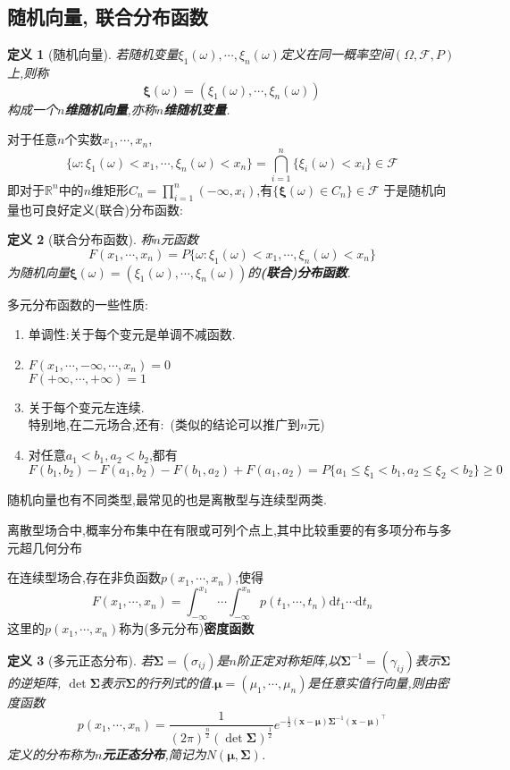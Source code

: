 \documentclass[12pt,a4paper]{article}
\newtheorem{definition}{定义}[subsection] %
\begin{document}
\subsection{随机向量, 联合分布函数}
\begin{definition}[随机向量]
    若随机变量$\xi_1(\omega),\cdots,\xi_n(\omega)$定义在同一概率空间$(\varOmega,\mathscr{F},P)$上,则称
    \[\bm{\xi}(\omega) = ( \xi_1(\omega), \cdots, \xi_n(\omega) )\]
    构成一个\textbf{$n$维随机向量},亦称\textbf{$n$维随机变量}.
\end{definition}
对于任意$n$个实数$x_1,\cdots,x_n$,\[\{ \omega: \xi_1(\omega)<x_1,\cdots,\xi_n(\omega)<x_n \} = \bigcap_{i=1}^{n}\{\xi_i(\omega)<x_i\} \in \mathscr{F}\]
即对于$\mathbb{R}^n$中的$n$维矩形$C_n=\prod_{i=1}^n(-\infty,x_i)$,有$\{\bm{\xi}(\omega)\in C_n\}\in \mathscr{F}$
于是随机向量也可良好定义(联合)分布函数:
\begin{definition}[联合分布函数]
    称$n$元函数\[F(x_1,\cdots,x_n)=P\{\omega:\xi_1(\omega)<x_1,\cdots,\xi_n(\omega)<x_n\}\]
    为随机向量$\bm{\xi}(\omega) = ( \xi_1(\omega), \cdots, \xi_n(\omega) )$的\textbf{(联合)分布函数}.
\end{definition}
多元分布函数的一些性质:
\begin{enumerate}[label=(\roman*),font=\upshape]
    \item 单调性:关于每个变元是单调不减函数.
    \item $F(x_1,\cdots,-\infty,\cdots,x_n)=0$\\$F(+\infty,\cdots,+\infty)=1$
    \item 关于每个变元左连续.\\

    特别地,在二元场合,还有:\ (类似的结论可以推广到$n$元)
    \item 对任意$a_1<b_1,a_2<b_2$,都有\[F(b_1,b_2)-F(a_1,b_2)-F(b_1,a_2)+F(a_1,a_2) = P\{a_1 \leq \xi_1 <b_1, a_2\leq\xi_2<b_2\}\geq0\]
\end{enumerate}

随机向量也有不同类型,最常见的也是离散型与连续型两类.

离散型场合中,概率分布集中在有限或可列个点上,其中比较重要的有多项分布与多元超几何分布

在连续型场合,存在非负函数$p(x_1,\cdots,x_n)$,使得\[F(x_1,\cdots,x_n) = \int_{-\infty}^{x_1}\cdots\int_{-\infty}^{x_n} p(t_1,\cdots,t_n)\mathrm{d}t_1\cdots\mathrm{d}t_n\]
这里的$p(x_1,\cdots,x_n)$称为(多元分布)\textbf{密度函数}
\begin{definition}[多元正态分布]
    若$\bm{\Sigma}=(\sigma_{ij})$是$n$阶正定对称矩阵,以$\bm{\Sigma}^{-1}=(\gamma_{ij})$表示$\bm{\Sigma}$的逆矩阵,
    $\det \bm{\Sigma}$表示$\bm{\Sigma}$的行列式的值.$\bm{\mu} = (\mu_1,\cdots,\mu_n)$是任意实值行向量,则由密度函数
    \[p(x_1,\cdots,x_n) = \frac{1}{(2\pi)^{\frac{n}{2}}(\det\bm{\Sigma})^{\frac{1}{2}}} e^{-\frac{1}{2} (\bm{x}-\bm{\mu})\bm{\Sigma}^{-1}(\bm{x}-\bm{\mu})^\top }\]
    定义的分布称为\textbf{$n$元正态分布},简记为$N(\bm{\mu},\bm{\Sigma})$.
\end{definition}
\end{document}
